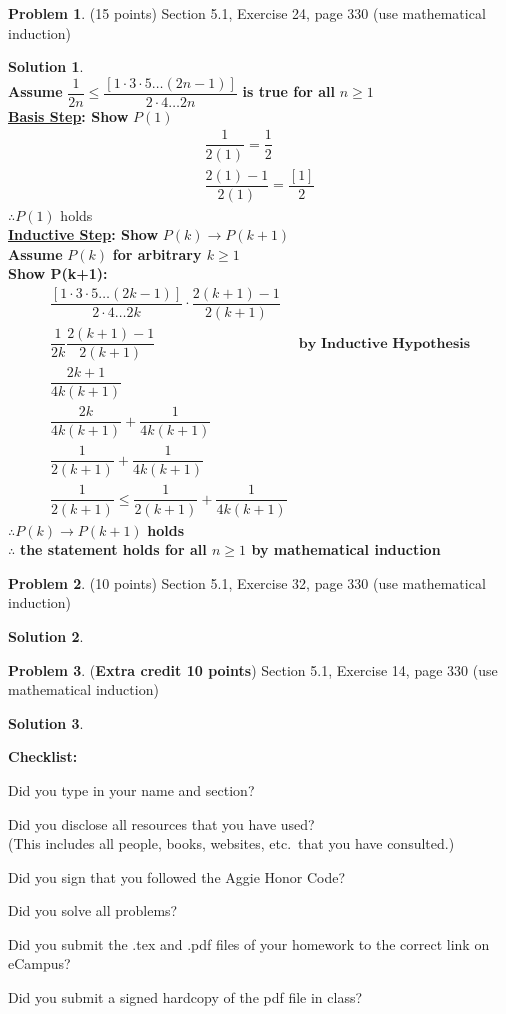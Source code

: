 \documentclass{article}
\theoremstyle{definition}
\newtheorem{problem}{Problem}
\newtheorem*{solution}{Solution}
\newcommand{\checklist}{\noindent\textbf{Checklist:}
\begin{compactitem}[$\Box$] 
\item Did you type in your name and section? 
\item Did you disclose all resources that you have used? \\
(This includes all people, books, websites, etc.\ that you have consulted.)
\item Did you sign that you followed the Aggie Honor Code? 
\item Did you solve all problems? 
\item Did you submit the .tex and .pdf files of your homework to the correct link on eCampus?
\item Did you submit a signed hardcopy of the pdf file in class? 
\end{compactitem}
}
\begin{document}
\begin{problem} (15 points)
Section 5.1, Exercise 24, page 330 (use mathematical induction)
\end{problem}
\begin{solution} \ \\
\textbf{Assume} $\dfrac{1}{2n} \le \dfrac{[1 \cdot 3 \cdot 5 \dots (2n-1) ]}{2\cdot4\dots2n}$ \textbf{is true for all} $n \ge 1 $ \\
\textbf{\underline{Basis Step}: Show } $P(1)$ \\
\begin{align*}
  \dfrac{1}{2(1)} = \dfrac{1}{2}\\
  \dfrac{2(1) - 1}{2(1)} = \dfrac{[1]}{2}
\end{align*}
$\therefore P(1)$ holds \\
\textbf{\underline{Inductive Step}: Show } $P(k) \rightarrow P(k+1)$ \\
\textbf{Assume} $P(k)$ \textbf{for arbitrary $k \ge  1$} \\
\textbf{Show P(k+1):} \\
\begin{align*}
  \dfrac{[1 \cdot 3 \cdot 5 \dots (2k-1) ]}{2\cdot4\dots2k}\cdot \dfrac{2(k+1 )- 1}{2(k+1)} \\
  \dfrac{1}{2k}\dfrac{2(k+1 )- 1}{2(k+1)} &\textbf{by Inductive Hypothesis} \\
  \dfrac{2k+1}{4k(k+1)} \\
  \dfrac{2k}{4k(k+1)} + \dfrac{1}{4k(k+1)} \\
  \dfrac{1}{2(k+1)} + \dfrac{1}{4k(k+1)} \\
  \dfrac{1}{2(k+1)} \le \dfrac{1}{2(k+1)} + \dfrac{1}{4k(k+1)}
\end{align*}
$\therefore P(k) \rightarrow P(k+1)$ \textbf{holds}\\
$\therefore$ \textbf{the statement holds for all $n \ge 1 $ by mathematical induction}
\end{solution}

\begin{problem} (10 points)
Section 5.1, Exercise 32, page 330 (use mathematical induction)
\end{problem}
\begin{solution} 
\end{solution}

\begin{problem} (\textbf{Extra credit 10 points})
Section 5.1, Exercise 14, page 330 (use mathematical induction)
\end{problem}
\begin{solution} 
\end{solution}

\goodbreak
\checklist
\end{document}
